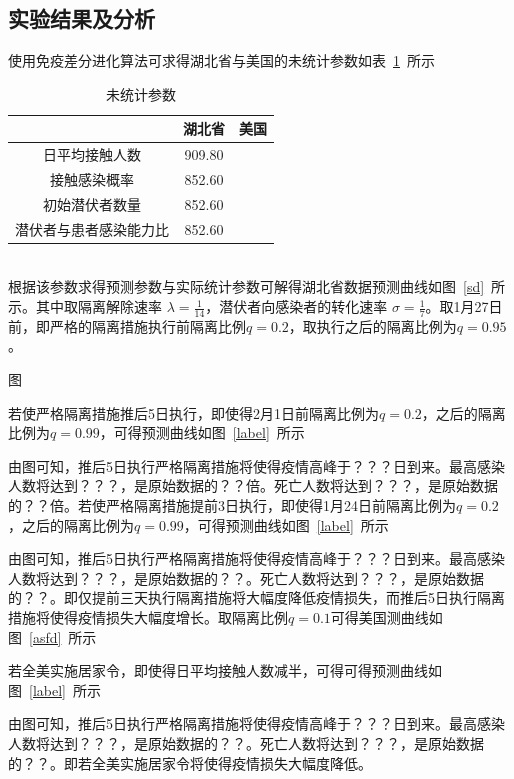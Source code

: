 \documentclass{whutmod}
\begin{document}
        \subsection{实验结果及分析}
        使用免疫差分进化算法可求得湖北省与美国的未统计参数如表~\ref{sdf}~所示
        	\begin{table}[H]
        	\centering		
        	\caption{未统计参数}\label{sdf}
        	\begin{tabular}{ccc}
        		\toprule[2pt]
        		\multicolumn{1}{m{5cm}}{\centering }
        		& \multicolumn{1}{m{5cm}}{\centering 湖北省}
        		& \multicolumn{1}{m{5cm}}{\centering 美国}
        		\\
        		\midrule[1pt]
        	日平均接触人数&   909.80\\ 
        	接触感染概率& 	852.60\\ 
        	初始潜伏者数量& 	852.60\\ 
        	潜伏者与患者感染能力比& 	852.60\\
        		\bottomrule[2pt]	
        	\end{tabular}
        \\
        根据该参数求得预测参数与实际统计参数可解得湖北省数据预测曲线如图~\ref{sd}~所示。其中取隔离解除速率 $\lambda =\frac{1}{14}$，潜伏者向感染者的转化速率 $\sigma=\frac{1}{7}$。取1月27日前，即严格的隔离措施执行前隔离比例$q=0.2$，取执行之后的隔离比例为$q=0.95$。
        
        图
        
        若使严格隔离措施推后5日执行，即使得2月1日前隔离比例为$q=0.2$，之后的隔离比例为$q=0.99$，可得预测曲线如图~\ref{label}~所示
        
        由图可知，推后5日执行严格隔离措施将使得疫情高峰于？？？日到来。最高感染人数将达到？？？，是原始数据的？？倍。死亡人数将达到？？？，是原始数据的？？倍。若使严格隔离措施提前3日执行，即使得1月24日前隔离比例为$q=0.2$，之后的隔离比例为$q=0.99$，可得预测曲线如图~\ref{label}~所示
        
        由图可知，推后5日执行严格隔离措施将使得疫情高峰于？？？日到来。最高感染人数将达到？？？，是原始数据的？？。死亡人数将达到？？？，是原始数据的？？。即仅提前三天执行隔离措施将大幅度降低疫情损失，而推后5日执行隔离措施将使得疫情损失大幅度增长。取隔离比例$q=0.1$可得美国测曲线如图~\ref{asfd}~所示
        
        若全美实施居家令，即使得日平均接触人数减半，可得可得预测曲线如图~\ref{label}~所示
        
        由图可知，推后5日执行严格隔离措施将使得疫情高峰于？？？日到来。最高感染人数将达到？？？，是原始数据的？？。死亡人数将达到？？？，是原始数据的？？。即若全美实施居家令将使得疫情损失大幅度降低。
        

\end{table}
\end{document}
